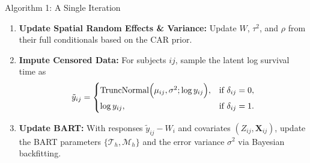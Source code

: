 \begin{frame}{Algorithm 1: A Single Iteration}
  \begin{enumerate}
    \item \textbf{Update Spatial Random Effects \& Variance:} Update \(W\), \(\tau^2\), and \(\rho\) from their full conditionals based on the CAR prior.
    
    \item \textbf{Impute Censored Data:} For subjects $ij$, sample the latent log survival time as
      \[
      \tilde{y}_{ij} =
      \begin{cases}
        \operatorname{TruncNormal}\Bigl(\mu_{ij},\sigma^2;\log y_{ij}\Bigr), & \text{if } \delta_{ij}=0, \\[1ex]
        \log y_{ij}, & \text{if } \delta_{ij}=1.
      \end{cases}
      \]
    \item \textbf{Update BART:} With responses \(\tilde{y}_{ij} - W_i\) and covariates \((Z_{ij},\mathbf{X}_{ij})\), update the BART parameters \(\{\mathcal{T}_h,\mathcal{M}_h\}\) and the error variance \(\sigma^2\) via Bayesian backfitting.
    
  \end{enumerate}
\end{frame}%
%
\documentclass[
  ignorenonframetext,
]{beamer}
\usepackage{pgfpages}
[numbered]
\beamertemplatenavigationsymbolsempty
 10000
\raggedbottom
{}
\AtBeginPart{
  \frame{\partpage}
}
\AtBeginSection{
  \ifbibliography
  \else
    \frame{\sectionpage}
  \fi
}
\AtBeginSubsection{
  \frame{\subsectionpage}
}
\usepackage{amsmath,amssymb}
\usepackage{lmodern}
\usepackage{setspace}

